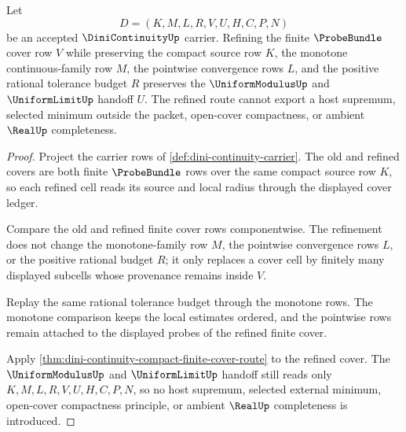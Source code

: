 \begin{theorem}
\label{thm:dini-continuity-monotone-cover-budget}
Let
$$
D=(K,M,L,R,V,U,H,C,P,N)
$$
be an accepted $\DiniContinuityUp$ carrier. Refining the finite
$\ProbeBundle$ cover row $V$ while preserving the compact source row $K$, the
monotone continuous-family row $M$, the pointwise convergence rows $L$, and
the positive rational tolerance budget $R$ preserves the $\UniformModulusUp$
and $\UniformLimitUp$ handoff $U$. The refined route cannot export a host
supremum, selected minimum outside the packet, open-cover compactness, or
ambient $\RealUp$ completeness.
\end{theorem}
\begin{proof}
Project the carrier rows of \autoref{def:dini-continuity-carrier}. The old
and refined covers are both finite $\ProbeBundle$ rows over the same compact
source row $K$, so each refined cell reads its source and local radius through
the displayed cover ledger.

Compare the old and refined finite cover rows componentwise. The refinement
does not change the monotone-family row $M$, the pointwise convergence rows
$L$, or the positive rational budget $R$; it only replaces a cover cell by
finitely many displayed subcells whose provenance remains inside $V$.

Replay the same rational tolerance budget through the monotone rows. The
monotone comparison keeps the local estimates ordered, and the pointwise rows
remain attached to the displayed probes of the refined finite cover.

Apply \autoref{thm:dini-continuity-compact-finite-cover-route} to the refined
cover. The $\UniformModulusUp$ and $\UniformLimitUp$ handoff still reads only
$K,M,L,R,V,U,H,C,P,N$, so no host supremum, selected external minimum,
open-cover compactness principle, or ambient $\RealUp$ completeness is
introduced.
\end{proof}

